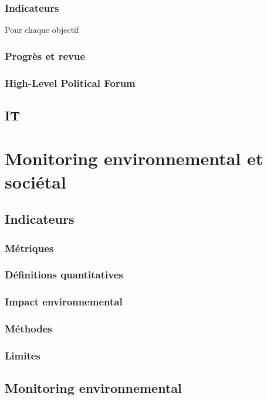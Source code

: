 \documentclass[a4paper,11pt,titlepage]{article}
\begin{document}
			\subsubsection{Indicateurs}
			Pour chaque objectif
			\subsubsection{Progrès et revue}
			\subsubsection{High-Level Political Forum}
			
		\subsection{IT}
	
	\section{Monitoring environnemental et sociétal}
		\subsection{Indicateurs}
			\subsubsection{Métriques}
			\subsubsection{Définitions quantitatives}
			\subsubsection{Impact environnemental}
			\subsubsection{Méthodes}			
			\subsubsection{Limites}
			
		\subsection{Monitoring environnemental}
\end{document}
